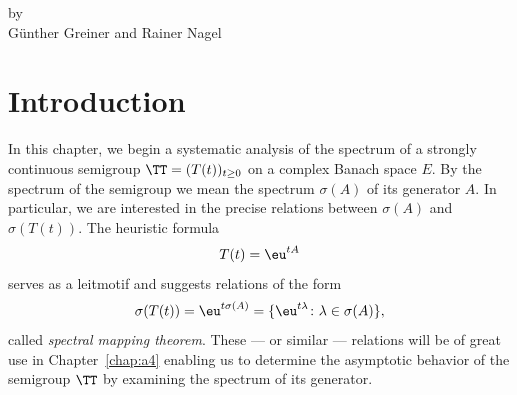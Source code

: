 \label{chap:a3}%
\pagestyle{headings}
\thispagestyle{empty}
{\Large
\vspace*{-.75cm}
by \\[.25em]
Günther Greiner and Rainer Nagel 
\vspace{.75cm}
\\
}
\section{Introduction}\label{sec:a3-1}%
In this chapter, we begin a systematic analysis of the spectrum of a strongly continuous semigroup $\TT = (T(t))_{t\geq 0}$ on a complex Banach space $E$.
By the spectrum of the semigroup we mean the spectrum $\sigma(A)$ of its generator $A$.
In particular, we are interested in the precise relations between $\sigma(A)$ and $\sigma(T(t))$.
The heuristic formula
\[
	T(t) = \eu^{tA}
\]
serves as a leitmotif and suggests relations of the form
\[
\sigma(T(t)) = \eu^{t\sigma(A)} = \{ \eu^{t\lambda} \colon \lambda \in \sigma
(A) \} ,
\]
called \emph{spectral mapping theorem}.
These --- or similar --- relations will be of great use in Chapter~\ref{chap:a4} enabling us to determine the asymptotic behavior of the semigroup $\TT$ by examining the spectrum of its generator.

